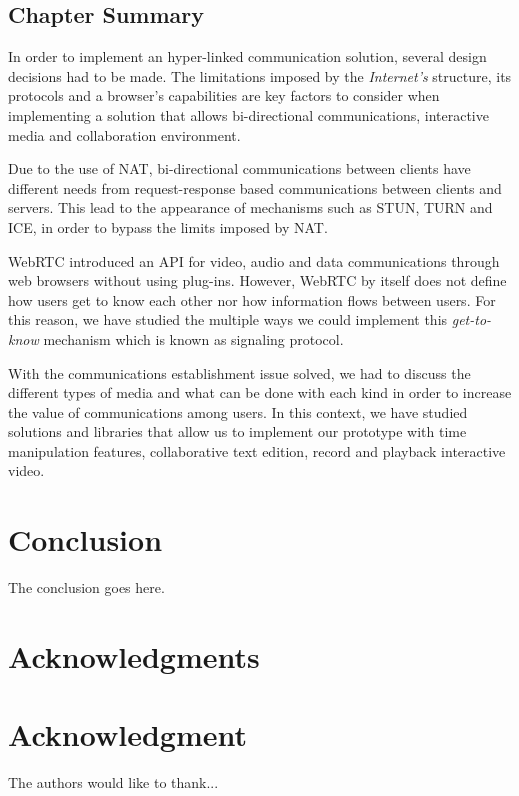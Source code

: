\documentclass[conference,compsoc,a4paper]{IEEEtran}
\begin{document}
\subsection{Chapter Summary}
\label{related:summary}

In order to implement an hyper-linked communication solution, several design decisions had to be made. The limitations imposed by the \emph{Internet's} structure, its protocols and a browser's capabilities are key factors to consider when implementing a solution that allows bi-directional communications, interactive media and collaboration environment.

Due to the use of \gls{NAT}, bi-directional communications between clients have different needs from request-response based communications between clients and servers.
This lead to the appearance of mechanisms such as \gls{STUN}, \gls{TURN} and \gls{ICE}, in order to bypass the limits imposed by \gls{NAT}.

\gls{WebRTC} introduced an \gls{API} for video, audio and data communications through web browsers without using plug-ins.
However, \gls{WebRTC} by itself does not define how users get to know each other nor how information flows between users. For this reason, we have studied the multiple ways we could implement this \emph{get-to-know} mechanism which is known as signaling protocol.

With the communications establishment issue solved, we had to discuss the different types of media and what can be done with each kind in order to increase the value of communications among users. In this context, we have studied solutions and libraries that allow us to implement our prototype with time manipulation features, collaborative text edition, record and playback interactive video. 

\section{Conclusion}
The conclusion goes here.

\ifCLASSOPTIONcompsoc
  
  \section*{Acknowledgments}
\else
  
  \section*{Acknowledgment}
\fi

The authors would like to thank...

%
%


\end{document}
